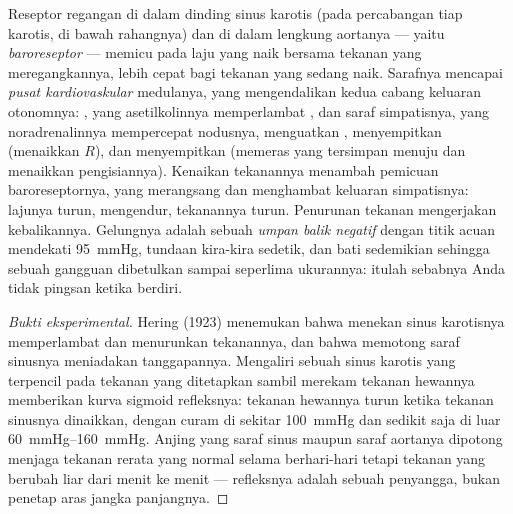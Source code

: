 \begin{definition}[Barorefleks]\label{def:b2:blood-pressure:baroreflex}
Reseptor regangan di dalam dinding sinus karotis (pada percabangan tiap
 karotis, di bawah rahangnya) dan di dalam lengkung aortanya ---
yaitu \emph{baroreseptor} --- memicu pada laju yang naik bersama
tekanan yang meregangkannya, lebih cepat bagi tekanan yang sedang naik.
Sarafnya mencapai \emph{pusat kardiovaskular} medulanya, yang
mengendalikan kedua cabang keluaran otonomnya: , yang
asetilkolinnya memperlambat , dan saraf simpatisnya,
yang noradrenalinnya mempercepat nodusnya, menguatkan ,
menyempitkan  (menaikkan $R$), dan menyempitkan 
(memeras  yang tersimpan menuju  dan menaikkan
pengisiannya). Kenaikan tekanannya menambah pemicuan baroreseptornya,
yang merangsang  dan menghambat keluaran simpatisnya:
lajunya turun,  mengendur, tekanannya turun. Penurunan
tekanan mengerjakan kebalikannya. Gelungnya adalah sebuah \emph{umpan
balik negatif} dengan titik acuan mendekati \qty{95}{mmHg}, tundaan
kira-kira sedetik, dan bati sedemikian sehingga sebuah gangguan
dibetulkan sampai seperlima ukurannya: itulah sebabnya Anda tidak
pingsan ketika berdiri.
\end{definition}
\begin{proof}[Bukti eksperimental]
Hering (1923) menemukan bahwa menekan sinus karotisnya memperlambat
 dan menurunkan tekanannya, dan bahwa memotong saraf
sinusnya meniadakan tanggapannya. Mengaliri sebuah sinus karotis yang
terpencil pada tekanan yang ditetapkan sambil merekam tekanan 
hewannya memberikan kurva sigmoid refleksnya: tekanan hewannya turun
ketika tekanan sinusnya dinaikkan, dengan curam di sekitar
\qty{100}{mmHg} dan sedikit saja di luar \qtyrange{60}{160}{mmHg}.
Anjing yang saraf sinus maupun saraf aortanya dipotong menjaga tekanan
rerata yang normal selama berhari-hari tetapi tekanan yang berubah
liar dari menit ke menit --- refleksnya adalah sebuah penyangga, bukan
penetap aras jangka panjangnya.
\end{proof}

